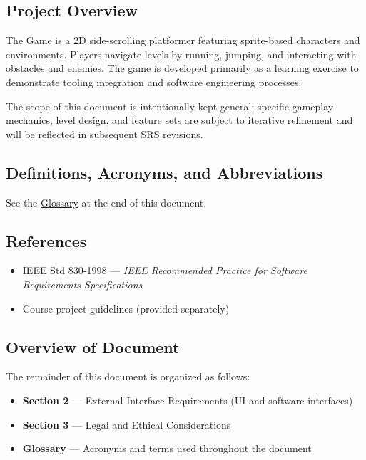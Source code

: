 \documentclass[12pt, letterpaper]{article}
\begin{document}
\subsection{Project Overview}

The Game is a 2D side-scrolling platformer featuring sprite-based characters and environments. Players navigate levels by running, jumping, and interacting with obstacles and enemies. The game is developed primarily as a learning exercise to demonstrate tooling integration and software engineering processes.

The scope of this document is intentionally kept general; specific gameplay mechanics, level design, and feature sets are subject to iterative refinement and will be reflected in subsequent SRS revisions.

\subsection{Definitions, Acronyms, and Abbreviations}

See the \hyperref[sec:glossary]{Glossary} at the end of this document.

\subsection{References}

\begin{itemize}[noitemsep]
    \item IEEE Std 830-1998 — \textit{IEEE Recommended Practice for Software Requirements Specifications}
    \item Course project guidelines (provided separately)
\end{itemize}

\subsection{Overview of Document}

The remainder of this document is organized as follows:

\begin{itemize}[noitemsep]
    \item \textbf{Section 2} — External Interface Requirements (UI and software interfaces)
    \item \textbf{Section 3} — Legal and Ethical Considerations
    \item \textbf{Glossary} — Acronyms and terms used throughout the document
\end{itemize}
\end{document}
